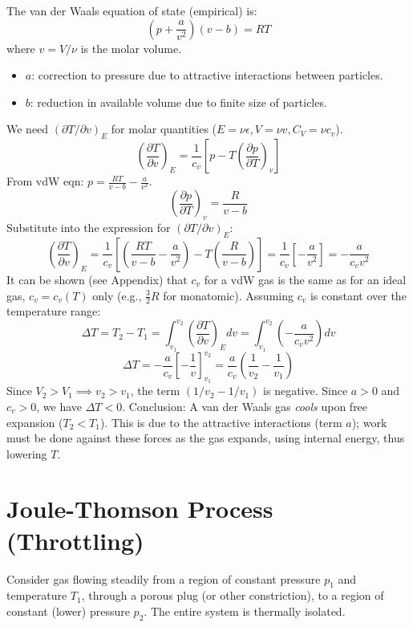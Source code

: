 \documentclass[11pt]{article}
\newcommand{\pderiv}[2]{\frac{\partial #1}{\partial #2}}
\newcommand{\gasR}{R} %
\begin{document}
The van der Waals equation of state (empirical) is:
\[ \left( p + \frac{a}{v^2} \right) (v-b) = \gasR T \]
where $v = V/\nu$ is the molar volume.
\begin{itemize}
    \item $a$: correction to pressure due to attractive interactions between particles.
    \item $b$: reduction in available volume due to finite size of particles.
\end{itemize}
We need $(\partial T/\partial v)_E$ for molar quantities ($E = \nu \epsilon, V=\nu v, C_V = \nu c_v$).
\[ \left( \pderiv{T}{v} \right)_E = \frac{1}{c_v} \left[ p - T \left( \pderiv{p}{T} \right)_v \right] \]
From vdW eqn: $p = \frac{\gasR T}{v-b} - \frac{a}{v^2}$.
\[ \left( \pderiv{p}{T} \right)_v = \frac{\gasR}{v-b} \]
Substitute into the expression for $(\partial T/\partial v)_E$:
\[ \left( \pderiv{T}{v} \right)_E = \frac{1}{c_v} \left[ \left( \frac{\gasR T}{v-b} - \frac{a}{v^2} \right) - T \left( \frac{\gasR}{v-b} \right) \right] = \frac{1}{c_v} \left[ -\frac{a}{v^2} \right] = -\frac{a}{c_v v^2} \]
It can be shown (see Appendix) that $c_v$ for a vdW gas is the same as for an ideal gas, $c_v = c_v(T)$ only (e.g., $\frac{3}{2}\gasR$ for monatomic). Assuming $c_v$ is constant over the temperature range:
\[ \Delta T = T_2 - T_1 = \int_{v_1}^{v_2} \left( \pderiv{T}{v} \right)_E dv = \int_{v_1}^{v_2} \left( -\frac{a}{c_v v^2} \right) dv \]
\[ \Delta T = -\frac{a}{c_v} \left[ -\frac{1}{v} \right]_{v_1}^{v_2} = \frac{a}{c_v} \left( \frac{1}{v_2} - \frac{1}{v_1} \right) \]
Since $V_2 > V_1 \implies v_2 > v_1$, the term $(1/v_2 - 1/v_1)$ is negative. Since $a>0$ and $c_v>0$, we have $\Delta T < 0$.
Conclusion: A van der Waals gas \emph{cools} upon free expansion ($T_2 < T_1$). This is due to the attractive interactions (term $a$); work must be done against these forces as the gas expands, using internal energy, thus lowering $T$.

\section*{Joule-Thomson Process (Throttling)}

Consider gas flowing steadily from a region of constant pressure $p_1$ and temperature $T_1$, through a porous plug (or other constriction), to a region of constant (lower) pressure $p_2$. The entire system is thermally isolated.
\end{document}
